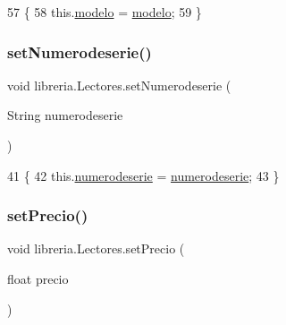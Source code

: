 \begin{DoxyCode}
57                                          \{
58         this.\mbox{\hyperlink{classlibreria_1_1_lectores_a1182864ccd674c11609aacc288bb7605}{modelo}} = \mbox{\hyperlink{classlibreria_1_1_lectores_a1182864ccd674c11609aacc288bb7605}{modelo}};
59     \}
\end{DoxyCode}
\mbox{\label{classlibreria_1_1_lectores_a73c52804c84f368cb75d6a110b893163}} 
\subsubsection{\texorpdfstring{set\+Numerodeserie()}{setNumerodeserie()}}
{\footnotesize\ttfamily void libreria.\+Lectores.\+set\+Numerodeserie (\begin{DoxyParamCaption}\item[{String}]{numerodeserie }\end{DoxyParamCaption})\hspace{0.3cm}{\ttfamily [inline]}}


\begin{DoxyCode}
41                                                        \{
42         this.\mbox{\hyperlink{classlibreria_1_1_lectores_acfa30a33712a3e927a4157c46e22dfd2}{numerodeserie}} = \mbox{\hyperlink{classlibreria_1_1_lectores_acfa30a33712a3e927a4157c46e22dfd2}{numerodeserie}};
43     \}
\end{DoxyCode}
\mbox{\label{classlibreria_1_1_lectores_a6702e7458b7c8cd48c8f7aa335c9fff5}} 
\subsubsection{\texorpdfstring{set\+Precio()}{setPrecio()}}
{\footnotesize\ttfamily void libreria.\+Lectores.\+set\+Precio (\begin{DoxyParamCaption}\item[{float}]{precio }\end{DoxyParamCaption})\hspace{0.3cm}{\ttfamily [inline]}}


